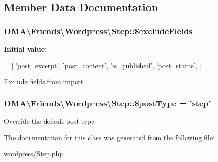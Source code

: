 \subsection{Member Data Documentation}
\hypertarget{classDMA_1_1Friends_1_1Wordpress_1_1Step_aa320e2b0f3f4a24c3cea41e133fd1145}{
\subsubsection[{\$exclude\+Fields}]{\setlength{\rightskip}{0pt plus 5cm}D\+M\+A\textbackslash{}\+Friends\textbackslash{}\+Wordpress\textbackslash{}\+Step\+::\$exclude\+Fields\hspace{0.3cm}{\ttfamily [protected]}}}\label{classDMA_1_1Friends_1_1Wordpress_1_1Step_aa320e2b0f3f4a24c3cea41e133fd1145}
{\bfseries Initial value\+:}
\begin{DoxyCode}
= [ 
        \textcolor{stringliteral}{'post\_excerpt'},
        \textcolor{stringliteral}{'post\_content'},
        \textcolor{stringliteral}{'is\_published'},
        \textcolor{stringliteral}{'post\_status'},
    ]
\end{DoxyCode}
Exclude fields from import \hypertarget{classDMA_1_1Friends_1_1Wordpress_1_1Step_abaa142e178d837a810e5048af7f36497}{
\subsubsection[{\$post\+Type}]{\setlength{\rightskip}{0pt plus 5cm}D\+M\+A\textbackslash{}\+Friends\textbackslash{}\+Wordpress\textbackslash{}\+Step\+::\$post\+Type = 'step'}}\label{classDMA_1_1Friends_1_1Wordpress_1_1Step_abaa142e178d837a810e5048af7f36497}
Override the default post type 

The documentation for this class was generated from the following file\+:\begin{DoxyCompactItemize}
\item 
wordpress/Step.\+php\end{DoxyCompactItemize}
